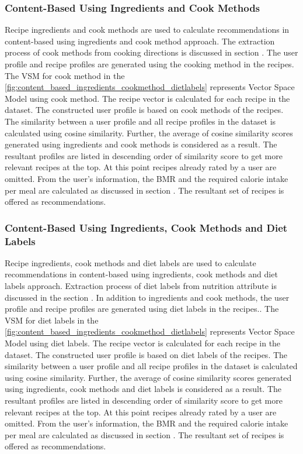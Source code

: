 \subsubsection{Content-Based Using Ingredients and Cook Methods}
\label{sec:cb_ingredients_cook_method}
Recipe ingredients and cook methods are used to calculate recommendations in content-based using ingredients and cook method approach. The extraction process of cook methods from cooking directions is discussed in section .  The user profile and recipe profiles are generated using the cooking method in the recipes. The VSM for cook method in the \autoref{fig:content_based_ingredients_cookmethod_dietlabels} represents Vector Space Model using cook method. The recipe vector is calculated for each recipe in the dataset. The constructed user profile is based on cook methods of the recipes. The similarity between a user profile and all recipe profiles in the dataset is calculated using cosine similarity. Further, the average of cosine similarity scores generated using ingredients and cook methods is considered as a result. The resultant profiles are listed in descending order of similarity score to get more relevant recipes at the top. At this point recipes already rated by a user are omitted. From the user's information, the BMR and the required calorie intake per meal are calculated as discussed in section . The resultant set of recipes is offered as recommendations. 

\subsubsection{Content-Based Using Ingredients, Cook Methods and Diet Labels}
\label{sec:cb_ingredients_cook_method_diet_labels}
Recipe ingredients, cook methods and diet labels are used to calculate recommendations in content-based using ingredients, cook methods and diet labels approach. Extraction process of diet labels from nutrition attribute is discussed in the section . In addition to ingredients and cook methods, the user profile and recipe profiles are generated using diet labels in the recipes.. The VSM for diet labels in the \autoref{fig:content_based_ingredients_cookmethod_dietlabels} represents Vector Space Model using diet labels. The recipe vector is calculated for each recipe in the dataset. The constructed user profile is based on diet labels of the recipes. The similarity between a user profile and all recipe profiles in the dataset is calculated using cosine similarity. Further, the average of cosine similarity scores generated using ingredients, cook methods and diet labels is considered as a result. The resultant profiles are listed in descending order of similarity score to get more relevant recipes at the top. At this point recipes already rated by a user are omitted. From the user's information, the BMR and the required calorie intake per meal are calculated as discussed in section . The resultant set of recipes is offered as recommendations. 

